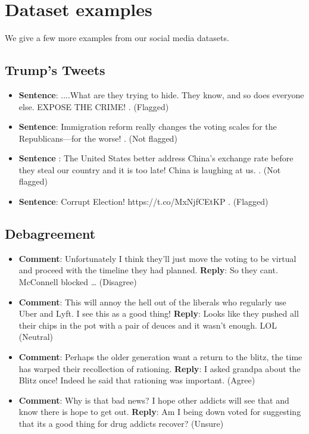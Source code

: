 \appendix
\section{Dataset examples}
We give a few more examples from our social media datasets.

\subsection{Trump's Tweets}
\begin{itemize}
    \item \textbf{Sentence}: ....What are they trying to hide. They know, and so does everyone else. EXPOSE THE CRIME! . (Flagged)
    \item \textbf{Sentence}: Immigration reform really changes the voting scales for the Republicans—for the worse! . (Not flagged)
    \item \textbf{Sentence} : The United States better address China's exchange rate before they steal our country and it is too late! China is laughing at us. . (Not flagged)
    \item \textbf{Sentence}: Corrupt Election! https://t.co/MxNjfCEtKP . (Flagged)
\end{itemize}

\subsection{Debagreement}

\begin{itemize}
    \item \textbf{Comment}: Unfortunately I think they'll just move the voting to be virtual and proceed with the timeline they had planned. \newline \textbf{Reply}: So they cant. McConnell blocked … (Disagree)
\item \textbf{Comment}: This will annoy the hell out of the liberals who regularly use Uber and Lyft. I see this as a good thing! \newline \textbf{Reply}: Looks like they pushed all their chips in the pot with a pair of deuces and it wasn't enough. LOL (Neutral)
\item \textbf{Comment}: Perhaps the older generation want a return to the blitz, the time has warped their recollection of rationing. \newline \textbf{Reply}: I asked grandpa about the Blitz once! Indeed he said that rationing was important. (Agree)
\item\textbf{Comment}: Why is that bad news? I hope other addicts will see that and know there is hope to get out. \newline \textbf{Reply}: Am I being down voted for suggesting that its a good thing for drug addicts recover? (Unsure)
\end{itemize}

